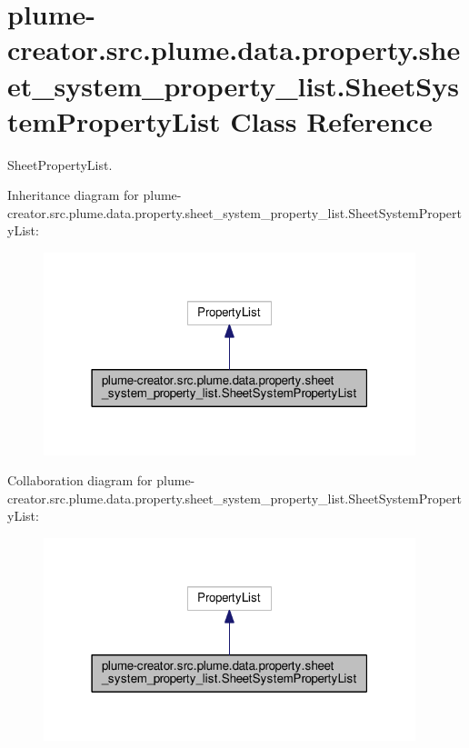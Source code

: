 \hypertarget{classplume-creator_1_1src_1_1plume_1_1data_1_1property_1_1sheet__system__property__list_1_1_sheet_system_property_list}{}\section{plume-\/creator.src.\+plume.\+data.\+property.\+sheet\+\_\+system\+\_\+property\+\_\+list.\+Sheet\+System\+Property\+List Class Reference}
\label{classplume-creator_1_1src_1_1plume_1_1data_1_1property_1_1sheet__system__property__list_1_1_sheet_system_property_list}


Sheet\+Property\+List.  




Inheritance diagram for plume-\/creator.src.\+plume.\+data.\+property.\+sheet\+\_\+system\+\_\+property\+\_\+list.\+Sheet\+System\+Property\+List\+:\nopagebreak
\begin{figure}[H]
\begin{center}
\leavevmode
\includegraphics[width=307pt]{classplume-creator_1_1src_1_1plume_1_1data_1_1property_1_1sheet__system__property__list_1_1_sheee182f9b3d8e2678fd65b87b4dc32d406}
\end{center}
\end{figure}


Collaboration diagram for plume-\/creator.src.\+plume.\+data.\+property.\+sheet\+\_\+system\+\_\+property\+\_\+list.\+Sheet\+System\+Property\+List\+:\nopagebreak
\begin{figure}[H]
\begin{center}
\leavevmode
\includegraphics[width=307pt]{classplume-creator_1_1src_1_1plume_1_1data_1_1property_1_1sheet__system__property__list_1_1_shee66ead724a86239c32dc46dce3ccad157}
\end{center}
\end{figure}
